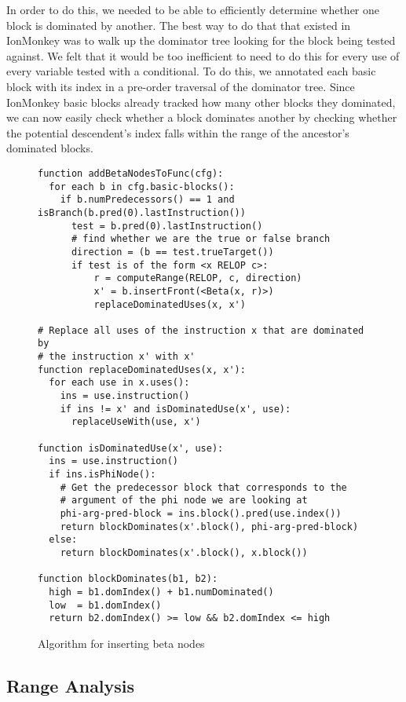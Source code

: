 \documentclass{article}
\begin{document}
In order to do this, we needed to be able to efficiently determine
whether one block is dominated by another. The best way to do that
that existed in IonMonkey was to walk up the dominator tree looking
for the block being tested against. We felt that it would be too
inefficient to need to do this for every use of every variable tested
with a conditional. To do this, we annotated each basic block with its
index in a pre-order traversal of the dominator tree. Since IonMonkey
basic blocks already tracked how many other blocks they dominated, we
can now easily check whether a block dominates another by checking
whether the potential descendent's index falls within the range of the
ancestor's dominated blocks.

\begin{figure}[ht]
\begin{center}
\begin{verbatim}
function addBetaNodesToFunc(cfg):
  for each b in cfg.basic-blocks():
    if b.numPredecessors() == 1 and isBranch(b.pred(0).lastInstruction())
      test = b.pred(0).lastInstruction()
      # find whether we are the true or false branch
      direction = (b == test.trueTarget())
      if test is of the form <x RELOP c>:
          r = computeRange(RELOP, c, direction)
          x' = b.insertFront(<Beta(x, r)>)
          replaceDominatedUses(x, x')

# Replace all uses of the instruction x that are dominated by
# the instruction x' with x'
function replaceDominatedUses(x, x'):
  for each use in x.uses():
    ins = use.instruction()
    if ins != x' and isDominatedUse(x', use):
      replaceUseWith(use, x')

function isDominatedUse(x', use):
  ins = use.instruction()
  if ins.isPhiNode():
    # Get the predecessor block that corresponds to the
    # argument of the phi node we are looking at
    phi-arg-pred-block = ins.block().pred(use.index())
    return blockDominates(x'.block(), phi-arg-pred-block)
  else:
    return blockDominates(x'.block(), x.block())

function blockDominates(b1, b2):
  high = b1.domIndex() + b1.numDominated()
  low  = b1.domIndex()
  return b2.domIndex() >= low && b2.domIndex <= high
\end{verbatim}
\end{center}
\caption{Algorithm for inserting beta nodes}
\label{fig:add_betas}
\end{figure}


\subsection{Range Analysis}
\end{document}
